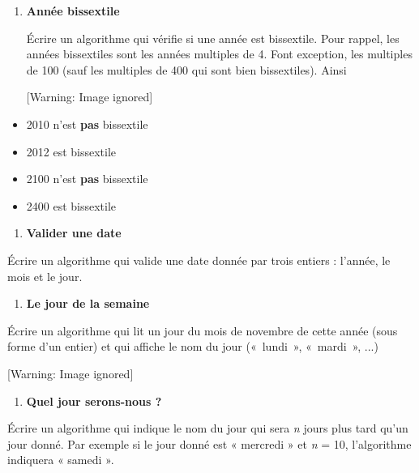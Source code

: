 \liststyleExercice
\setcounter{saveenum}{\value{enumi}}
\begin{enumerate}
\setcounter{enumi}{\value{saveenum}}
\item {\sffamily\bfseries
Année bissextile}

{
Écrire un algorithme qui vérifie si une année est bissextile. Pour
rappel, les années bissextiles sont les années multiples de 4. Font
exception, les multiples de 100 (sauf les multiples de 400 qui sont
bien bissextiles). Ainsi}
\begin{center}
 [Warning: Image ignored] %

\end{center}
\end{enumerate}
\liststyleListv
\begin{itemize}
\item {
2010 n'est \textbf{pas} bissextile}
\item {
2012 est bissextile}
\item {
2100 n'est \textbf{pas} bissextile}
\item {
2400 est bissextile}
\end{itemize}
\liststyleExercice
\begin{enumerate}
\item {\sffamily\bfseries
Valider une date}
\end{enumerate}
{
Écrire un algorithme qui valide une date donnée par trois entiers :
l’année, le mois et le jour.}

\liststyleExercice
\setcounter{saveenum}{\value{enumi}}
\begin{enumerate}
\setcounter{enumi}{\value{saveenum}}
\item {\sffamily\bfseries
Le jour de la semaine}
\end{enumerate}
{
Écrire un algorithme qui lit un jour du mois de novembre de cette année
(sous forme d'un entier) et qui affiche le nom du jour
(«~lundi~», «~mardi~», ...)}

\begin{center}
 [Warning: Image ignored] %

\end{center}
\liststyleExercice
\setcounter{saveenum}{\value{enumi}}
\begin{enumerate}
\setcounter{enumi}{\value{saveenum}}
\item {\sffamily\bfseries
Quel jour serons-nous ?}
\end{enumerate}
{
Écrire un algorithme qui indique le nom du jour qui sera \textit{n}
jours plus tard qu’un jour donné. Par exemple si le jour donné est «
mercredi » et \textit{n} = 10, l’algorithme indiquera « samedi ».}

